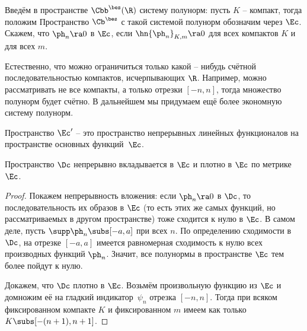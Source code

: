 \documentclass[a4paper]{article}
\begin{document}
Введём в пространстве $\Cbb^\bes(\R)$ систему полунорм: пусть $K$ -- компакт, тогда
положим
Пространство $\Cb^\bes$ с такой системой полунорм обозначим через $\Ec$. Скажем, что
$\ph_n \ra 0$ в $\Ec$, если $\hn{\ph_n}_{K,m} \ra0$ для всех компактов $K$ и для всех $m$.

\begin{note}
Естественно, что можно ограничиться только какой -- нибудь счётной последовательностью компактов,
исчерпывающих $\R$. Например, можно рассматривать не все компакты, а только отрезки $[-n,n]$,
тогда множество полунорм будет счётно. В дальнейшем мы придумаем ещё более экономную систему
полунорм.
\end{note}

\begin{df}
Пространство $\Ec'$ -- это пространство непрерывных линейных функционалов на пространстве основных функций~$\Ec$.
\end{df}


\begin{stm}
Пространство $\Dc$ непрерывно вкладывается в $\Ec$ и плотно в $\Ec$ по метрике $\Ec$.
\end{stm}
\begin{proof}
Покажем непрерывность вложения: если $\ph_n \ra 0$ в $\Dc$, то последовательность
их образов в $\Ec$ (то есть этих же самых функций, но рассматриваемых в другом пространстве)
тоже сходится к нулю в $\Ec$. В самом деле, пусть $\supp\ph_n \subs [-a,a]$ при всех $n$.
По определению сходимости в $\Dc$, на отрезке $[-a,a]$ имеется равномерная сходимость
к нулю всех производных функций $\ph_n$. Значит, все полунормы в пространстве $\Ec$ тем более
пойдут к нулю.

Докажем, что $\Dc$ плотно в $\Ec$. Возьмём произвольную функцию из $\Ec$ и домножим её
на гладкий индикатор~$\psi_n$ отрезка $[-n,n]$. Тогда при всяком фиксированном компакте $K$
и фиксированном $m$ имеем
как только $K \subs [-(n+1),n+1]$.
\end{proof}
\end{document}
